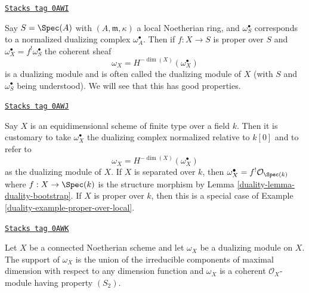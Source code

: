 \begin{example}
\label{duality-example-proper-over-local}
\href{https://stacks.math.columbia.edu/tag/0AWI}{\texttt{Stacks tag 0AWI}}

Say $S = \Spec(A)$ with $(A, \mathfrak m, \kappa)$
a local Noetherian ring, and $\omega_S^\bullet$ corresponds to
a normalized dualizing complex $\omega_A^\bullet$. Then if
$f : X \to S$ is proper over $S$ and $\omega_X^\bullet = f^!\omega_S^\bullet$
the coherent sheaf
$$
\omega_X = H^{-\dim(X)}(\omega_X^\bullet)
$$
is a dualizing module and is often called the dualizing module
of $X$ (with $S$ and $\omega_S^\bullet$ being understood). We will
see that this has good properties.
\end{example}

\begin{example}
\label{duality-example-equidimensional-over-field}
\href{https://stacks.math.columbia.edu/tag/0AWJ}{\texttt{Stacks tag 0AWJ}}

Say $X$ is an equidimensional scheme of finite type
over a field $k$. Then it is customary to take
$\omega_X^\bullet$ the dualizing complex normalized relative to $k[0]$
and to refer to
$$
\omega_X = H^{-\dim(X)}(\omega_X^\bullet)
$$
as the dualizing module of $X$. If $X$ is separated over $k$, then
$\omega_X^\bullet = f^!\mathcal{O}_{\Spec(k)}$ where
$f : X \to \Spec(k)$ is the structure morphism by
Lemma \ref{duality-lemma-duality-bootstrap}. If $X$ is proper over $k$, then
this is a special case of Example \ref{duality-example-proper-over-local}.
\end{example}

\begin{lemma}
\label{duality-lemma-dualizing-module}
\href{https://stacks.math.columbia.edu/tag/0AWK}{\texttt{Stacks tag 0AWK}}

Let $X$ be a connected Noetherian scheme and let $\omega_X$ be a dualizing
module on $X$. The support of $\omega_X$ is the union of the irreducible
components of maximal dimension with respect to any dimension function
and $\omega_X$ is a coherent $\mathcal{O}_X$-module having property $(S_2)$.
\end{lemma}

